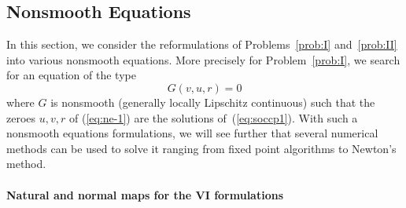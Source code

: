 \subsection{Nonsmooth Equations}
\label{Sec:NonsmoothEquations}
In this section, we consider the reformulations of Problems~\ref{prob:I} and~\ref{prob:II} into various nonsmooth equations. More precisely for Problem~\ref{prob:I}, we search for an equation of the type
\begin{equation}
  \label{eq:ne-1}
  G(v,u,r) = 0
\end{equation}
where $G$ is nonsmooth (generally locally Lipschitz continuous) such that the zeroes $u,v,r$ of (\ref{eq:ne-1}) are the solutions of~(\ref{eq:soccp1}). With such a nonsmooth equations formulations, we will see further that several numerical methods can be used to solve it ranging from fixed point algorithms to Newton's method.

\paragraph{Natural and normal maps for the VI formulations}

